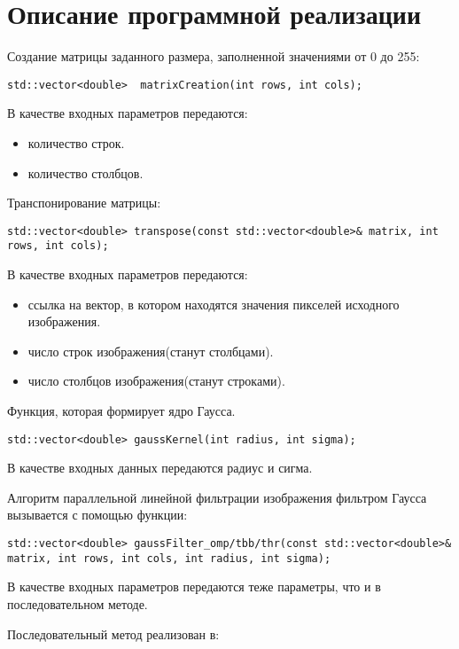 \documentclass{report}
\begin{document}
\section*{Описание программной реализации}
Создание матрицы заданного размера, заполненной значениями от 0 до 255:
\begin{lstlisting}
std::vector<double>  matrixCreation(int rows, int cols);
\end{lstlisting}
\par В качестве входных параметров передаются:
\begin{itemize}
\item количество строк.
\item количество столбцов.
\end{itemize}
\par Транспонирование матрицы:
\begin{lstlisting}
std::vector<double> transpose(const std::vector<double>& matrix, int rows, int cols);
\end{lstlisting}
\par В качестве входных параметров передаются:
\begin{itemize}
\item ссылка на вектор, в котором находятся значения пикселей исходного изображения.
\item число строк изображения(станут столбцами).
\item число столбцов изображения(станут строками).
\end{itemize}
\par Функция, которая формирует ядро Гаусса.
\begin{lstlisting}
std::vector<double> gaussKernel(int radius, int sigma);
\end{lstlisting}
\par В качестве входных данных передаются радиус и сигма.
\par Алгоритм параллельной линейной фильтрации изображения фильтром Гаусса вызывается с помощью функции:
\begin{lstlisting}
std::vector<double> gaussFilter_omp/tbb/thr(const std::vector<double>& matrix, int rows, int cols, int radius, int sigma);
\end{lstlisting}
\par В качестве входных параметров передаются теже параметры, что и в последовательном методе.
\par Последовательный метод реализован в:
\end{document}
